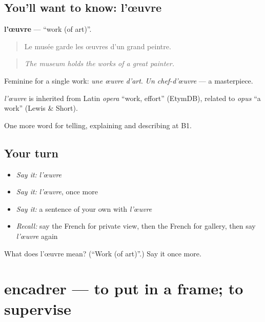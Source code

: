 \subsection*{You'll want to know: l'œuvre}
\textbf{l'œuvre} — \textquotedblleft{}work (of art)\textquotedblright{}.

\begin{quote}
Le musée garde les œuvres d'un grand peintre.
\end{quote}

\begin{quote}
\emph{The museum holds the works of a great painter.}
\end{quote}

Feminine for a single work: \emph{une œuvre d'art}. \emph{Un chef-d'œuvre} — a masterpiece.

\begin{cousinweb}
\emph{l'œuvre} is inherited from Latin \emph{opera} \textquotedblleft{}work, effort\textquotedblright{} (EtymDB), related to \emph{opus} \textquotedblleft{}a work\textquotedblright{} (Lewis \& Short).
\end{cousinweb}

\begin{grammarlens}[title={What you've built}]
One more word for telling, explaining and describing at B1.
\end{grammarlens}

\subsection*{Your turn}
\begin{itemize}
\raggedright
  \item \emph{Say it:} \emph{l'œuvre}
  \item \emph{Say it:} \emph{l'œuvre}, once more
  \item \emph{Say it:} a sentence of your own with \emph{l'œuvre}
  \item \emph{Recall:} say the French for private view, then the French for gallery, then say \emph{l'œuvre} again
\end{itemize}

\begin{tcolorbox}[breakable,colback=teal!4,colframe=teal!35!black,title={Before you move on}]
What does l'œuvre mean? (\textquotedblleft{}Work (of art)\textquotedblright{}.) Say it once more.
\end{tcolorbox}
\section[encadrer]{encadrer — to put in a frame; to supervise}

